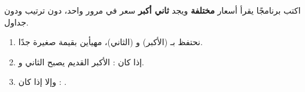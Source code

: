 \begin{statement}
اكتب برنامجًا يقرأ  أسعار \textbf{مختلفة} ويجد \textbf{ثاني أكبر} سعر في مرور واحد، دون ترتيب ودون جداول.
\end{statement}
\begin{stepsbox}\begin{enumerate}
\item نحتفظ بـ  (الأكبر) و (الثاني)، مهيأين بقيمة صغيرة جدًا.
\item إذا كان : الأكبر القديم يصبح الثاني و.
\item وإلا إذا كان : .
\end{enumerate}\end{stepsbox}
